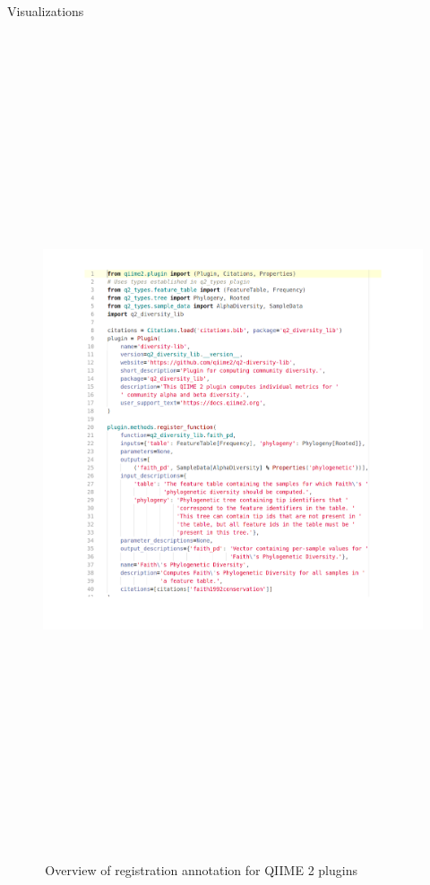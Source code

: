 \documentclass[final]{beamer}
\newlength{\colwidth}
\begin{document}
\begin{frame}[t]
\begin{columns}[t]
\begin{column}{\colwidth}
\begin{block}{Visualizations}
    \begin{figure}[tph!]
    {\includegraphics[height=24cm]{assets/registrationDiagram}}
    \caption{\,Overview of registration annotation for QIIME 2 plugins}
    \label{fig:registrationDiagram}
    \end{figure}

  \end{block}


\end{column}
\end{columns}
\end{frame}
\end{document}
